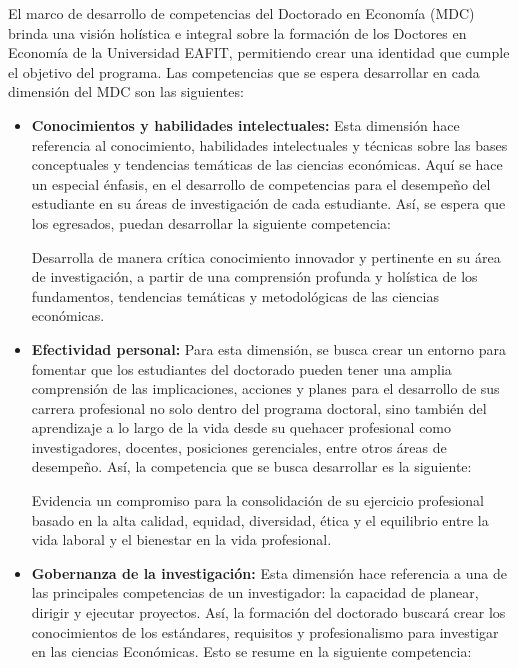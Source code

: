 El marco de desarrollo de competencias del Doctorado en Economía (MDC) brinda una visión holística e integral sobre la formación de los Doctores en Economía de la Universidad EAFIT, permitiendo crear una identidad que cumple el objetivo del programa. Las competencias que se espera desarrollar en cada dimensión del MDC son las siguientes: 

\begin{itemize}
    \item \textbf{Conocimientos y habilidades intelectuales: } Esta dimensión hace referencia al conocimiento, habilidades intelectuales y técnicas sobre las bases conceptuales y tendencias temáticas de las ciencias económicas. Aquí se hace un especial énfasis, en el desarrollo de competencias para el desempeño del estudiante en su áreas de investigación de cada estudiante. Así, se espera que los egresados, puedan desarrollar la siguiente competencia:
    
    \begin{tcolorbox}[colback=red!5!white,colframe=red!75!black]
  Desarrolla de manera crítica conocimiento innovador y pertinente en su área de investigación, a partir de una comprensión profunda y holística de los fundamentos, tendencias temáticas y metodológicas de las ciencias económicas.
\end{tcolorbox}

\item \textbf{Efectividad personal:} Para esta dimensión, se busca crear un entorno para fomentar que los estudiantes del doctorado pueden tener una amplia comprensión de las implicaciones, acciones y planes para el desarrollo de sus carrera profesional no solo dentro del programa doctoral, sino también del aprendizaje a lo largo de la vida desde su quehacer profesional como investigadores, docentes, posiciones gerenciales, entre otros áreas de desempeño. Así, la competencia que se busca desarrollar es la siguiente:
    
        \begin{tcolorbox}[colback=red!5!white,colframe=red!75!black]
Evidencia un compromiso para la consolidación de su ejercicio profesional basado en la alta calidad, equidad, diversidad, ética y el equilibrio entre la vida laboral y el bienestar en la vida profesional.
\end{tcolorbox}

    \item \textbf{Gobernanza de la investigación:} Esta dimensión hace referencia a una de las principales competencias de un investigador: la capacidad de planear, dirigir y ejecutar proyectos. Así, la formación del doctorado buscará crear los conocimientos de los estándares, requisitos y profesionalismo para investigar en las ciencias Económicas. Esto se resume en la siguiente competencia:
    

\end{itemize}

